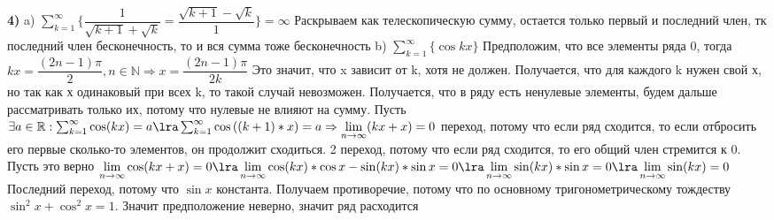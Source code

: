 \documentclass{article}
\begin{document}
	\textbf{4)} \bs
	a) $\sum_{k=1}^{\infty} \bigg\{\dfrac{1}{\sqrt{k + 1} + \sqrt{k}} =  \dfrac{\sqrt{k + 1} - \sqrt{k}}{1}\bigg\} = \infty$ \sspace
	Раскрываем как телескопическую сумму, остается только первый и последний член, тк последний член бесконечность, то и вся сумма тоже бесконечность \sspace
	b) $\sum_{k = 1}^{\infty} \{\cos{kx}\}$ \sspace
	Предположим, что все элементы ряда 0, тогда $kx = \dfrac{(2n - 1)\pi}{2}, n \in \mathbb{N} \Rightarrow x = \dfrac{(2n - 1)\pi}{2k}$ \sspace Это значит, что x зависит от k, хотя не должен. Получается, что для каждого k нужен свой х, но так как х одинаковый при всех k, то такой случай невозможен. \sspace
	Получается, что в ряду есть ненулевые элементы, будем дальше рассматривать только их, потому что нулевые не влияют на сумму. \sspace
	Пусть $\exists a \in \mathbb{R}: \sum_{k = 1}^{\infty} \cos(kx)= a \lra \sum_{k = 1}^{\infty} \cos{((k + 1) * x)}= a \Rightarrow \lim\limits_{n \to \infty} (kx + x) = 0$  переход, потому что если ряд сходится, то если отбросить его первые сколько-то элементов, он продолжит сходиться. 2 переход, потому что если ряд сходится, то его общий член стремится к 0. \sspace
	Пусть это верно
	$
	\lim\limits_{n \to \infty} \cos(kx + x) = 0 \lra \lim\limits_{n \to \infty} \cos(kx) * \cos x - \sin(kx) * \sin x = 0 \lra \lim\limits_{n \to \infty} \sin(kx) * \sin x = 0 \lra \lim\limits_{n \to \infty} \sin(kx) = 0 \sspace
	$ 
	Последний переход, потому что $\sin x$ константа. Получаем противоречие, потому что по основному тригонометрическому тождеству $\sin^2 x + \cos^2 x = 1$. Значит предположение неверно, значит ряд расходится
\end{document}
